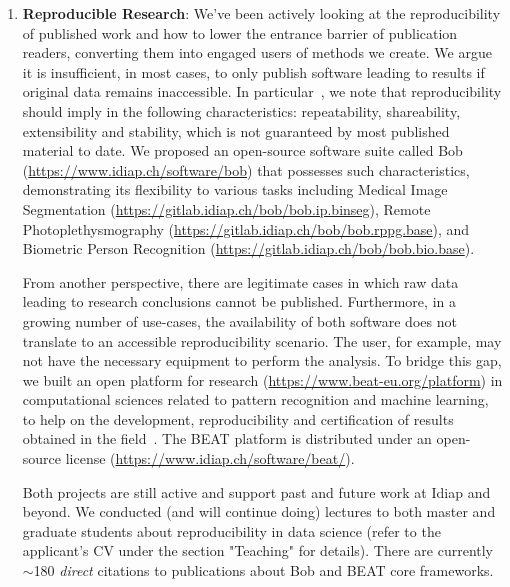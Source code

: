 \documentclass[a4paper]{nihbiosketch}
\begin{document}
\begin{enumerate}
\item \textbf{Reproducible Research}: We've been actively looking at the
    reproducibility of published work and how to lower the entrance barrier of
    publication readers, converting them into engaged users of methods we
    create.  We argue it is insufficient, in most cases, to only publish
    software leading to results if original data remains inaccessible. In
    particular~\cite{acmmm-2012}, we note that reproducibility should imply in
    the following characteristics: repeatability, shareability, extensibility
    and stability, which is not guaranteed by most published material to date.
    We proposed an open-source software suite called Bob
    (\url{https://www.idiap.ch/software/bob}) that possesses such
    characteristics, demonstrating its flexibility to various tasks including
    Medical Image Segmentation
    (\url{https://gitlab.idiap.ch/bob/bob.ip.binseg}), Remote
    Photoplethysmography (\url{https://gitlab.idiap.ch/bob/bob.rppg.base}), and
    Biometric Person Recognition
    (\url{https://gitlab.idiap.ch/bob/bob.bio.base}).

    From another perspective, there are legitimate cases in which raw data
    leading to research conclusions cannot be published.  Furthermore, in a
    growing number of use-cases, the availability of both software does not
    translate to an accessible reproducibility scenario.  The user, for
    example, may not have the necessary equipment to perform the analysis.  To
    bridge this gap, we built an open platform for research
    (\url{https://www.beat-eu.org/platform}) in computational sciences related
    to pattern recognition and machine learning, to help on the development,
    reproducibility and certification of results obtained in the
    field~\cite{icml-2017-1}.  The BEAT platform is distributed under an
    open-source license (\url{https://www.idiap.ch/software/beat/}).

    Both projects are still active and support past and future work at Idiap
    and beyond.  We conducted (and will continue doing) lectures to both master
    and graduate students about reproducibility in data science (refer to the
    applicant's CV under the section "Teaching" for details).  There are
    currently $\sim$180 \textit{direct} citations to publications about Bob and
    BEAT core frameworks.

\end{enumerate}

\renewcommand{\refname}{Referenced Publications}
\nocite{*}
\printbibliography
\end{document}
